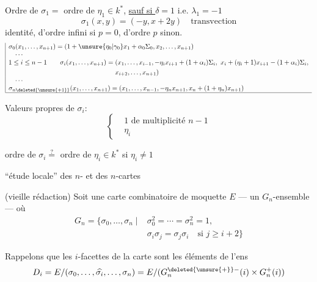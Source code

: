 Ordre de $\sigma_1=$ ordre de $\eta_1\in k^*$, \uline{sauf si $\delta=1$} i.e. $\lambda_1=-1$
\[
\sigma_1(x,y)=(-y,x+2y)\quad\text{transvection}
\]
 identité, d'ordre infini si $p=0$, d'ordre $p$ sinon.
\[
\begin{array}{|l}
\sigma_0(x_1,\ldots,x_{n+1})=(1+\unsure{\eta_0|\gamma_0}x_1+\alpha_0\Sigma_0,x_2,\ldots,x_{n+1})\\
\quad\cdots\\
\begin{aligned}
1\leq i\leq n-1\qquad\sigma_i(x_1,\ldots,x_{n+1})={}&(x_1,\ldots,x_{i-1},-\eta_i x_{i+1}+(1+\alpha_i)\Sigma_i,\ x_i+(\eta_i+1)x_{i+1}-(1+\alpha_i)\Sigma_i,\\
&x_{i+2},\ldots,x_{n+1})
\end{aligned}\\
\quad\cdots\\
\sigma_{n\deleted{\unsure{+1}}}(x_1,\ldots,x_{n+1})=(x_1,\ldots,x_{n-1},-\eta_nx_{n+1},x_n+(1+\eta_n)x_{n+1})\\\hline
\end{array}
\]

Valeurs propres de $\sigma_i$:
\[
\left\{\begin{aligned}&1\text{ de multiplicité }n-1\\&\eta_i\end{aligned}\right.
\]

ordre de $\sigma_i\overset{?}{=}$ ordre de $\eta_i\in k^*$ si $\eta_i\ne1$

\qquad{}

``étude locale'' des $n$- et des $n$-cartes

(vieille rédaction)
Soit  une carte combinatoire  de moquette $E$ --- un $G_n$-ensemble --- où
\[
\begin{aligned}
G_n=\{\sigma_0,\ldots,\sigma_n\mid{}&\sigma_0^2=\cdots=\sigma_n^2=1,\\
&\sigma_i\sigma_j=\sigma_j\sigma_i\quad\text{si }j\geq i+2\}
\end{aligned}
\]

Rappelons que les $i$-facettes de la carte sont les éléments de l'ens
\[
D_i=E/(\sigma_0,\ldots,\widehat{\sigma_i},\ldots,\sigma_n)
=E/(G_n^{\deleted{\unsure{+}}-}(i)\times G_n^+(i))
\]

